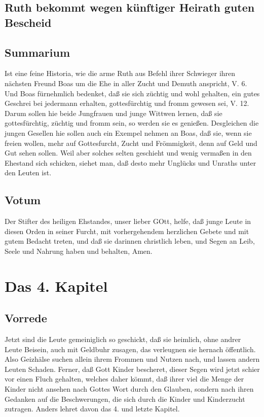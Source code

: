 \section{Ruth bekommt wegen künftiger Heirath guten Bescheid}
\section{Summarium}

Ist eine feine Historia, wie die arme Ruth aus Befehl ihrer Schwieger ihren nächsten Freund Boas um die Ehe in aller Zucht und Demuth anspricht, V. 6. Und Boas fürnehmlich bedenket, daß sie sich züchtig und wohl gehalten, ein gutes Geschrei bei jedermann erhalten, gottesfürchtig und fromm gewesen sei, V. 12. Darum sollen hie beide Jungfrauen und junge Wittwen lernen, daß sie gottesfürchtig, züchtig und fromm sein, so werden sie es genießen. Desgleichen die jungen Gesellen hie sollen auch ein Exempel nehmen an Boas, daß sie, wenn sie freien wollen, mehr auf Gottesfurcht, Zucht und Frömmigkeit, denn auf Geld und Gut sehen sollen. Weil aber solches selten geschieht und wenig vermaßen in den Ehestand sich schicken, siehet man, daß desto mehr Unglücks und Unraths unter den Leuten ist.

\section{Votum}

Der Stifter des heiligen Ehstandes, unser lieber GOtt, helfe, daß junge Leute in diesen Orden in seiner Furcht, mit vorhergehendem herzlichen Gebete und mit gutem Bedacht treten, und daß sie darinnen christlich leben, und Segen an Leib, Seele und Nahrung haben und behalten, Amen.

\chapter{Das 4. Kapitel}

\section{Vorrede}

Jetzt sind die Leute gemeiniglich so geschickt, daß sie heimlich, ohne andrer Leute Beisein, auch mit Geldbuhr zusagen, das verleugnen sie hernach öffentlich. Also Geizhälse suchen allein ihrem Frommen und Nutzen nach, und lassen andern Leuten Schaden. Ferner, daß Gott Kinder bescheret, dieser Segen wird jetzt schier vor einen Fluch gehalten, welches daher kömmt, daß ihrer viel die Menge der Kinder nicht ansehen nach Gottes Wort durch den Glauben, sondern nach ihren Gedanken auf die Beschwerungen, die sich durch die Kinder und Kinderzucht zutragen. Anders lehret davon das 4. und letzte Kapitel.

